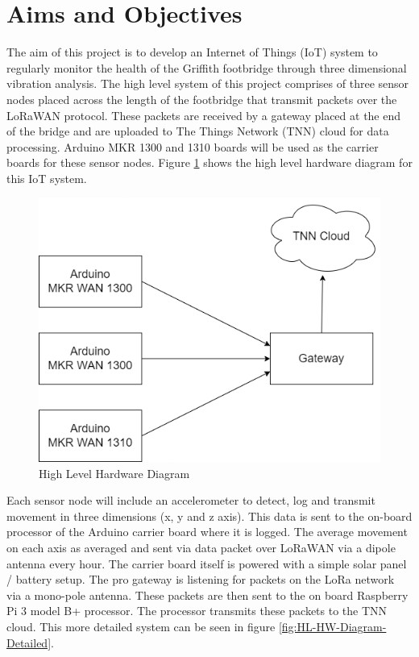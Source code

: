 \section{Aims and Objectives}
The aim of this project is to develop an Internet of Things (IoT) system to regularly monitor the health of the Griffith footbridge through three dimensional vibration analysis. The high level system of this project comprises of three sensor nodes placed across the length of the footbridge that transmit packets over the LoRaWAN protocol. These packets are received by a gateway placed at the end of the bridge and are uploaded to The Things Network (TNN) cloud for data processing. Arduino MKR 1300 and 1310 boards will be used as the carrier boards for these sensor nodes. Figure \ref{fig:HL-HW-Diagram} shows the high level hardware diagram for this IoT system.  

\begin{figure}[h!]
\center
\includegraphics[scale=0.35]{Images/HW-Diagram.png}
\caption{High Level Hardware Diagram}
\label{fig:HL-HW-Diagram}
\end{figure}

Each sensor node will include an accelerometer to detect, log and transmit movement in three dimensions (x, y and z axis). This data is sent to the on-board processor of the Arduino carrier board where it is logged. The average movement on each axis as averaged and sent via data packet over LoRaWAN via a dipole antenna every hour. The carrier board itself is powered with a simple solar panel / battery setup. The pro gateway is listening for packets on the LoRa network via a mono-pole antenna. These packets are then sent to the on board Raspberry Pi 3 model B+ processor. The processor transmits these packets to the TNN cloud. This more detailed system can be seen in figure \ref{fig:HL-HW-Diagram-Detailed}.

